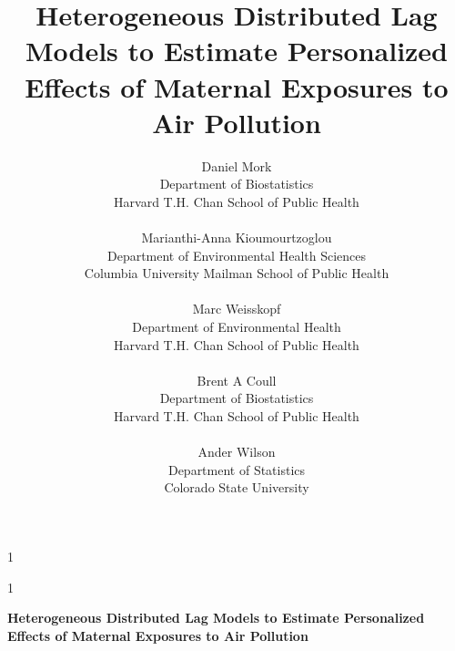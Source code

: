 \documentclass[12pt]{article}
\newcommand{\blind}{1}
\begin{document}
%

\def\spacingset#1{\renewcommand{\baselinestretch}%
{#1}\small\normalsize} \spacingset{1}



\blind
{
  \title{\bf Heterogeneous Distributed Lag Models to Estimate Personalized Effects of Maternal Exposures to Air Pollution}
  \author{Daniel Mork\\
Department of Biostatistics\\ 
Harvard T.H. Chan School of Public Health\\\\
Marianthi-Anna Kioumourtzoglou\\
Department of Environmental Health Sciences\\
Columbia University Mailman School of Public Health\\\\
Marc Weisskopf\\
Department of Environmental Health\\ 
Harvard T.H. Chan School of Public Health\\\\ 
Brent A Coull\\
Department of Biostatistics\\
Harvard T.H. Chan School of Public Health\\\\ 
Ander Wilson\\ 
Department of Statistics\\ Colorado State University}
  \maketitle
} \fi

\blind
{
  \bigskip
  \bigskip
  \bigskip
  \begin{center}
    {\LARGE\bf Heterogeneous Distributed Lag Models to Estimate Personalized Effects of Maternal Exposures to Air Pollution}
\end{center}
  \medskip
} \fi
\end{document}
